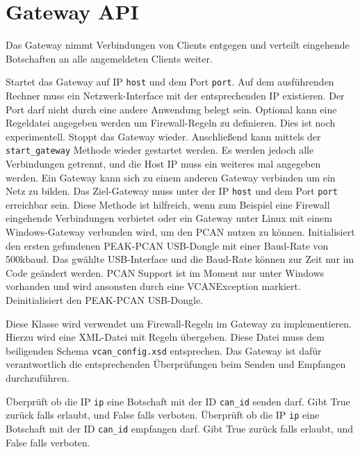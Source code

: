 \section{Gateway API}
\label{sec:vcan_gateway_api}

\begin{description}
    Das Gateway nimmt Verbindungen von Clients entgegen und verteilt eingehende Botschaften an alle angemeldeten Clients weiter.
    \begin{description}
        Startet das Gateway auf IP \texttt{host} und dem Port \texttt{port}. Auf dem ausführenden Rechner muss ein Netzwerk-Interface mit der entsprechenden IP existieren. Der Port darf nicht durch eine andere Anwendung belegt sein. Optional kann eine Regeldatei angegeben werden um Firewall-Regeln zu definieren. Dies ist noch experimentell.
        Stoppt das Gateway wieder. Anschließend kann mittels der \texttt{start\_gateway} Methode wieder gestartet werden. Es werden jedoch alle Verbindungen getrennt, und die Host IP muss ein weiteres mal angegeben werden.
        Ein Gateway kann sich zu einem anderen Gateway verbinden um ein Netz zu bilden. Das Ziel-Gateway muss unter der IP \texttt{host} und dem Port \texttt{port} erreichbar sein. Diese Methode ist hilfreich, wenn zum Beispiel eine Firewall eingehende Verbindungen verbietet oder ein Gateway unter Linux mit einem Windows-Gateway verbunden wird, um den PCAN nutzen zu können.
        Initialisiert den ersten gefundenen PEAK-PCAN USB-Dongle mit einer Baud-Rate von 500kbaud. Das gwählte USB-Interface und die Baud-Rate können zur Zeit nur im Code geändert werden. PCAN Support ist im Moment nur unter Windows vorhanden und wird ansonsten durch eine VCANException markiert.
        Deinitialisiert den PEAK-PCAN USB-Dongle.
    \end{description}
\end{description}

\begin{description}
    Diese Klasse wird verwendet um Firewall-Regeln im Gateway zu implementieren. Hierzu wird eine XML-Datei mit Regeln übergeben. Diese Datei muss dem beiligenden Schema \texttt{vcan\_config.xsd} entsprechen. Das Gateway ist dafür verantwortlich die entsprechenden Überprüfungen beim Senden und Empfangen durchzuführen.
    \begin{description}
        Überprüft ob die IP \texttt{ip} eine Botschaft mit der ID \texttt{can\_id} senden darf. Gibt True zurück falls erlaubt, und False falls verboten.
        Überprüft ob die IP \texttt{ip} eine Botschaft mit der ID \texttt{can\_id} empfangen darf. Gibt True zurück falls erlaubt, und False falls verboten.
    \end{description}
\end{description}

